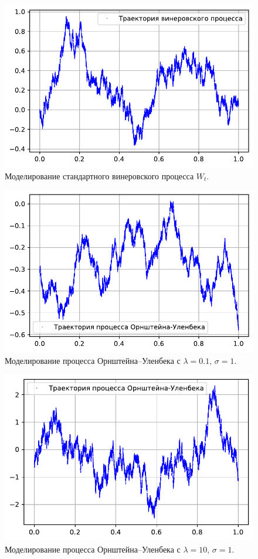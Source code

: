 \documentclass[16pt]{article}
\begin{document}
\begin{figure}[h]
	\center
	\includegraphics[scale=0.7]{9_1.pdf}
	\caption{Моделирование стандартного винеровского процесса $W_t$.}
\end{figure}

\begin{figure}[h]
	\center
	\includegraphics[scale=0.7]{9_2.pdf}
	\caption{Моделирование процесса Орнштейна--Уленбека с $\lambda = 0.1,\, \sigma = 1$.}
\end{figure}

\begin{figure}[h]
	\center
	\includegraphics[scale=0.7]{9_3.pdf}
	\caption{Моделирование процесса Орнштейна--Уленбека с $\lambda = 10,\, \sigma = 1$.}
\end{figure}
\end{document}
